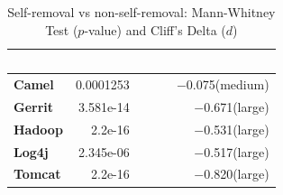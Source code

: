 


\begin{table}[t]
	\begin{center}
		\caption{Self-removal vs non-self-removal: Mann-Whitney Test ($p$-value) and Cliff's Delta ($d$)}
		\label{tbl:statistic}
		\begin{tabular}{l| rrr}
			\toprule
			\textbf{\thead{Project}} & \textbf{\thead{$p$-value}}&~~~ & \textbf{\thead{$d$}}\\ 
			\midrule
			\textbf{Camel }   &  0.0001253& ~~~ &  $-$0.075(medium)  \\  
			\textbf{Gerrit}   &  3.581e-14& ~~~ &  $-$0.671(large)  \\  
			\textbf{Hadoop}   &   2.2e-16& ~~~ &  $-$0.531(large)  \\  
			\textbf{Log4j}   &  2.345e-06 & ~~~ &  $-$0.517(large)  \\  
			\textbf{Tomcat}   &  2.2e-16  & ~~~ &  $-$0.820(large) \\  
			\bottomrule
		\end{tabular}
	\end{center} 
	\vspace{-0.1in}   
\end{table}











